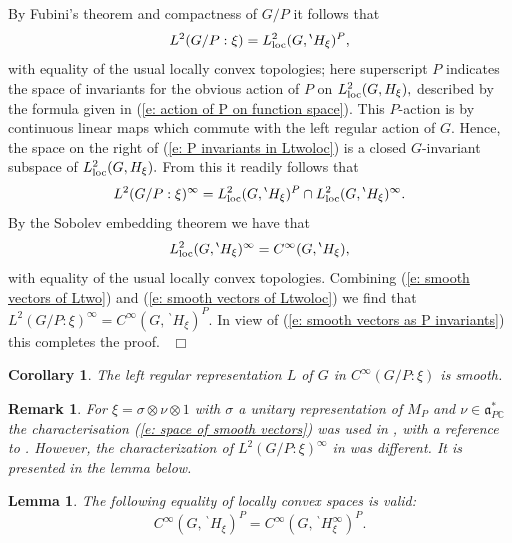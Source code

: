 \documentclass[12pt,a4paper]{article}
\newtheorem{Cor}[Thm]{Corollary}
\newtheorem{Lemma}[Thm]{Lemma}
\newtheorem{Rem}[Thm]{Remark}
\newenvironment{cor}[0]{\begin{Cor}\noindent}%
{\end{Cor}}
\newenvironment{lemma}[0]{\begin{Lemma}\noindent}%
{\end{Lemma}}
\newenvironment{rem}[0]{\begin{Rem}\noindent\rm}%
{\end{Rem}}
\def\proof{\par\noindent{\it Proof.}{\ }{\ }}
\def\qed{~\hfill\hbox{$\Box$}\medbreak}
\def\msy#1{{\mathbb #1}}
\def\C{{\msy C}}
\def\gs{\sigma}
\def\got#1{\mathfrak #1}
\def\fa{{\got a}}
\def\iC{{\scriptscriptstyle \C}}
\numberwithin{Thm}{section}
\numberwithin{equation}{section}
\def\faPdc{{\fa_{P\iC}^*}}
\numberwithin{equation}{section}
\def\bp{\!{\,}^\backprime}
\def\faPdc{\fa_{P\iC}^*}
\begin{document}
\proof  
By Fubini's theorem and compactness of $G/P$ it follows that
\begin{equation}
\label{e: P invariants in Ltwoloc}
L^2(G/P:\xi)  =  L^2_{\rm loc}(G, \bp H_\xi)^{P},
\end{equation}
with equality of the usual locally convex topologies; here superscript $P$ indicates
the space of invariants for the obvious action of $P$ on $L^2_{\rm loc}(G, H_\xi),$ 
described by the formula given in (\ref{e: action of P on function space}). This $P$-action is by continuous linear maps which commute with the left regular action of $G.$  Hence, the space on the right of (\ref{e: P invariants in Ltwoloc}) is a closed $G$-invariant subspace of 
$L^2_{\rm loc}(G, H_\xi).$ From this it readily follows that
\begin{equation}
\label{e: smooth vectors of Ltwo}
L^2(G/P: \xi)^\infty = L^2_{\rm loc}(G, \bp H_\xi)^{P}\cap L^2_{\rm loc}(G, \bp H_\xi)^\infty.
\end{equation}
By the Sobolev embedding theorem we have that 
\begin{equation}
\label{e: smooth vectors of Ltwoloc}
L^2_{\rm loc}(G, \bp H_\xi)^\infty = C^\infty(G, \bp H_\xi),
\end{equation}
with equality of the usual locally convex topologies. 
Combining (\ref{e: smooth vectors of Ltwo}) and (\ref{e: smooth vectors of Ltwoloc})
we find that $L^2(G/P:\xi)^\infty = C^\infty(G, \bp H_\xi)^P.$ In view of 
(\ref{e: smooth vectors as P invariants}) this completes the proof.
\qed

\begin{cor}
The left regular representation $L$ of $G$ in $C^\infty(G/P:\xi)$ is smooth.
\end{cor}

\begin{rem}
For $\xi = \gs \otimes \nu \otimes 1$ with $\gs$ a unitary representation of 
$M_P$ and $\nu \in \faPdc$ the  characterisation (\ref{e: space of smooth vectors})
was used in \cite{BScfunc},
with a reference to \cite[III.7.9]{BWcc}. However, the characterization of 
$L^2(G/P:\xi)^\infty$ in \cite{BWcc} was different. It is presented in the lemma below.
\end{rem}
\medbreak

\begin{lemma} 
\label{l: equality of spaces of smooth vectors}
The following equality of locally convex spaces is valid:
\begin{equation}
\label{e: equality of spaces of smooth vectors}
C^\infty(G, \bp H_\xi)^P = C^\infty(G, \bp H_\xi^\infty)^{P}.
\end{equation} 
\end{lemma}
\end{document}
